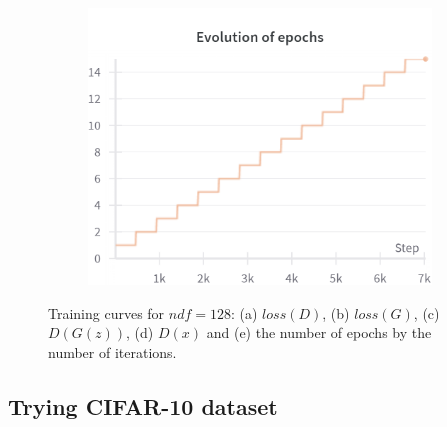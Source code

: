\begin{figure}[H]
    \begin{subfigure}{0.45\textwidth}
        \centering
        \includegraphics[width=0.95\linewidth]{ndf/128/epochs.png}
        \caption{}
        \label{subfig:ndf/128/epochs}
    \end{subfigure}%

    \caption{Training curves for $ndf=128$: (a) $loss(D)$, (b) $loss(G)$, (c) $D(G(z))$, (d) $D(x)$ and (e) the number of epochs by the number of iterations.}
    \label{fig:ndf/128_losses}
\end{figure}

\subsection{Trying CIFAR-10 dataset} \label{appendix:cifar10_32}

